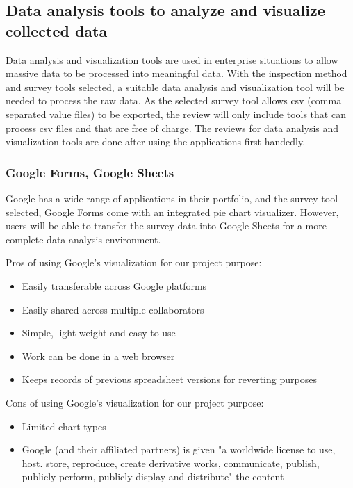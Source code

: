 \documentclass[10pt,journal,compsoc,draftclsnofoot]{IEEEtran}
\begin{document}
\newpage

\subsection{Data analysis tools to analyze and visualize collected data}
Data analysis and visualization tools are used in enterprise situations to allow massive data to be processed into meaningful data.
With the inspection method and survey tools selected, a suitable data analysis and visualization tool will be needed to process the raw data.
As the selected survey tool allows csv (comma separated value files) to be exported, the review will only include tools that can process csv files and that are free of charge.
The reviews for data analysis and visualization tools are done after using the applications first-handedly. 

\subsubsection{Google Forms, Google Sheets}
Google has a wide range of applications in their portfolio, and the survey tool selected, Google Forms come with an integrated pie chart visualizer.
However, users will be able to transfer the survey data into Google Sheets for a more complete data analysis environment.

Pros of using Google's visualization for our project purpose:
\begin{itemize}
\item Easily transferable across Google platforms
\item Easily shared across multiple collaborators
\item Simple, light weight and easy to use
\item Work can be done in a web browser
\item Keeps records of previous spreadsheet versions for reverting purposes
\end{itemize}

Cons of using Google's visualization for our project purpose:
\begin{itemize}
\item Limited chart types
\item Google (and their affiliated partners) is given "a worldwide license to use, host. store, reproduce, create derivative works, communicate, publish, publicly perform, publicly display and distribute" the content \cite{google}
\end{itemize}
\end{document}
